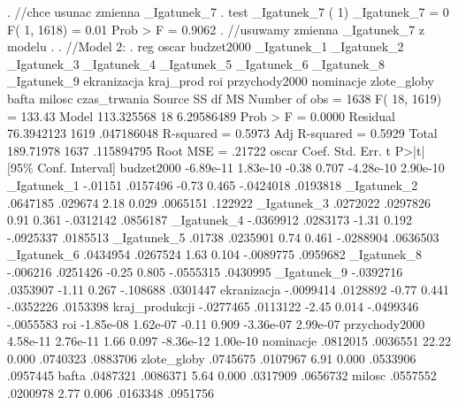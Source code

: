 \begin{stlog}
{\smallskip}
. //chce usunac zmienna _Igatunek_7
. test _Igatunek_7
{\smallskip}
 ( 1)  _Igatunek_7 = 0
{\smallskip}
       F(  1,  1618) =    0.01
            Prob > F =    0.9062
{\smallskip}
. //usuwamy zmienna _Igatunek_7 z modelu
. 
. //Model 2:
. reg oscar  budzet2000 _Igatunek_1 _Igatunek_2 _Igatunek_3 _Igatunek_4 _Igatunek_5 _Igatunek_6 _Igatunek_8
 _Igatunek_9 ekranizacja kraj_prod roi przychody2000 nominacje zlote_globy bafta milosc czas_trwania
{\smallskip}
      Source {\VBAR}       SS       df       MS              Number of obs =    1638
           F( 18,  1619) =  133.43
       Model {\VBAR}  113.325568    18  6.29586489           Prob > F      =  0.0000
    Residual {\VBAR}  76.3942123  1619  .047186048           R-squared     =  0.5973
           Adj R-squared =  0.5929
       Total {\VBAR}   189.71978  1637  .115894795           Root MSE      =  .21722
{\smallskip}
         oscar {\VBAR}      Coef.   Std. Err.      t    P>|t|     [95\% Conf. Interval]
    budzet2000 {\VBAR}  -6.89e-11   1.83e-10    -0.38   0.707    -4.28e-10    2.90e-10
   _Igatunek_1 {\VBAR}    -.01151   .0157496    -0.73   0.465    -.0424018    .0193818
   _Igatunek_2 {\VBAR}   .0647185    .029674     2.18   0.029     .0065151     .122922
   _Igatunek_3 {\VBAR}   .0272022   .0297826     0.91   0.361    -.0312142    .0856187
   _Igatunek_4 {\VBAR}  -.0369912   .0283173    -1.31   0.192    -.0925337    .0185513
   _Igatunek_5 {\VBAR}     .01738   .0235901     0.74   0.461    -.0288904    .0636503
   _Igatunek_6 {\VBAR}   .0434954   .0267524     1.63   0.104    -.0089775    .0959682
   _Igatunek_8 {\VBAR}   -.006216   .0251426    -0.25   0.805    -.0555315    .0430995
   _Igatunek_9 {\VBAR}  -.0392716   .0353907    -1.11   0.267     -.108688    .0301447
   ekranizacja {\VBAR}  -.0099414   .0128892    -0.77   0.441    -.0352226    .0153398
kraj_produkcji {\VBAR}  -.0277465   .0113122    -2.45   0.014    -.0499346   -.0055583
           roi {\VBAR}  -1.85e-08   1.62e-07    -0.11   0.909    -3.36e-07    2.99e-07
 przychody2000 {\VBAR}   4.58e-11   2.76e-11     1.66   0.097    -8.36e-12    1.00e-10
     nominacje {\VBAR}   .0812015   .0036551    22.22   0.000     .0740323    .0883706
   zlote_globy {\VBAR}   .0745675   .0107967     6.91   0.000     .0533906    .0957445
         bafta {\VBAR}   .0487321   .0086371     5.64   0.000     .0317909    .0656732
        milosc {\VBAR}   .0557552   .0200978     2.77   0.006     .0163348    .0951756

\end{stlog}
